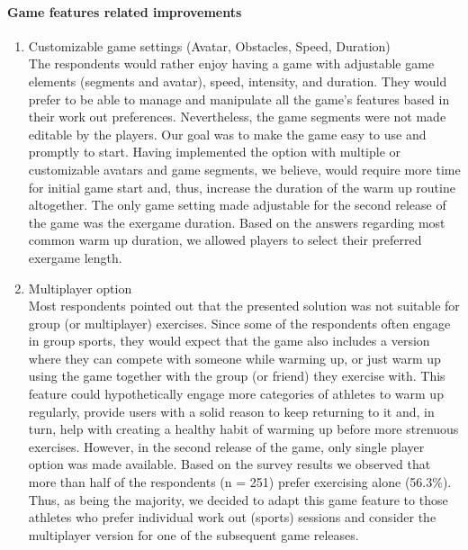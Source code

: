 \paragraph{Game features related improvements}
\begin{enumerate}
	\item Customizable game settings (Avatar, Obstacles, Speed, Duration)\\
The respondents would rather enjoy having a game with adjustable game elements (segments and avatar), speed, intensity, and duration. They would prefer to be able to manage and manipulate all the game's features based in their work out preferences. Nevertheless, the game segments were not made editable by the players. Our goal was to make the game easy to use and promptly to start. Having implemented the option with multiple or customizable avatars and game segments, we believe, would require more time for initial game start and, thus, increase the duration of the warm up routine altogether. The only game setting made adjustable for the second release of the game was the exergame duration. Based on the answers regarding most common warm up duration, we allowed players to select their preferred exergame length. 
\item Multiplayer option\\
Most respondents pointed out that the presented solution was not suitable for group (or multiplayer) exercises. Since some of the respondents often engage in group sports, they would expect that the game also includes a version where they can compete with someone while warming up, or just warm up using the game together with the group (or friend) they exercise with. This feature could hypothetically engage more categories of athletes to warm up regularly, provide users with a solid reason to keep returning to it and, in turn, help with creating a healthy habit of warming up before more strenuous exercises. However, in the second release of the game, only single player option was made available. Based on the survey results we observed that more than half of the respondents (n = 251) prefer exercising alone (56.3\%). Thus, as being the majority, we decided to adapt this game feature to those athletes who prefer individual work out (sports) sessions and consider the multiplayer version for one of the subsequent game releases. 
\end{enumerate}
